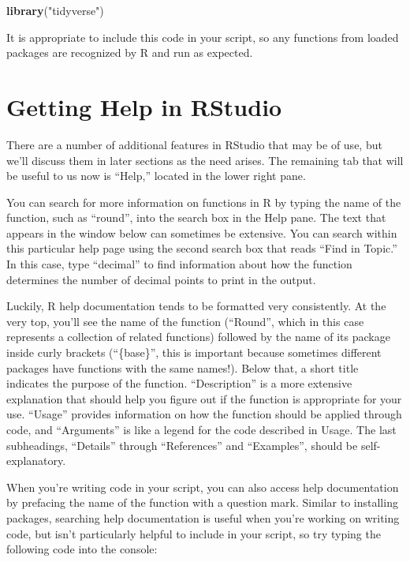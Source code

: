 \documentclass[]{Nemilov}
\newenvironment{Shaded}{\begin{snugshade}}{\end{snugshade}}
\newcommand{\KeywordTok}[1]{\textcolor[rgb]{0.13,0.29,0.53}{\textbf{#1}}}
\newcommand{\NormalTok}[1]{#1}
\newcommand{\StringTok}[1]{\textcolor[rgb]{0.31,0.60,0.02}{#1}}
\begin{document}
\begin{Shaded}
\begin{Highlighting}[]
\KeywordTok{library}\NormalTok{(}\StringTok{"tidyverse"}\NormalTok{)}
\end{Highlighting}
\end{Shaded}

It is appropriate to include this code in your script, so any functions from loaded
packages are recognized by R and run as expected.

\hypertarget{r-getting-started-rstudio-help}{%
\section{Getting Help in RStudio}\label{r-getting-started-rstudio-help}}

There are a number of additional features in RStudio that may be of
use, but we'll discuss them in later sections as the need arises.
The remaining tab that will be useful to us now is ``Help,'' located in the lower
right pane.

You can search for more information on functions in R by typing the name
of the function, such as ``round'', into the search box in the Help pane.
The text that appears in the window below can sometimes be extensive.
You can search within this particular help page
using the second search box that reads ``Find in Topic.''
In this case, type ``decimal'' to find information about how the function
determines the number of decimal points to print in the output.

Luckily, R help documentation tends to be formatted very consistently. At the
very top, you'll see the name of the function (``Round'', which in this case
represents a collection of related functions) followed by the name of its
package inside curly brackets (``\{base\}'', this is important because sometimes
different packages have functions with the same names!). Below that, a short title
indicates the purpose of the function. ``Description'' is a more extensive
explanation that should help you figure out if the function is appropriate for
your use. ``Usage'' provides information on how the function should be applied
through code, and ``Arguments'' is like a legend for the code described in Usage.
The last subheadings, ``Details'' through ``References'' and ``Examples'', should be
self-explanatory.

When you're writing code in your script, you can also access help documentation
by prefacing the name of the function with a question mark.
Similar to installing packages, searching help documentation is useful
when you're working on writing code, but isn't particularly helpful to include in
your script, so try typing the following code into the console:
\end{document}
